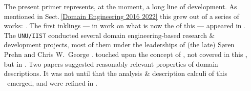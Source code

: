 
\begynd
\pind The present primer represents, at the moment, a long line of development.
\pind As mentioned in Sect.\,\vref{Domain Engineering 2016 2022} this grew out of a series of works:
\cite{TheSEBook3,Kiev:2010ptI,Kiev:2010ptII,BjornerFAoC2015MDAAD,BjornerTOSEM2018,BjornerMonograph2020}. 
\begynd
\pind The first inklings --- in  work on 
\pind what is now the  of this \primer --- \nyl appeared in
      \cite[1995-1996]{UNUIIST:37,UNUIIST:46,db:UNUIIST:48,UNUIIST:58,UNUIIST:59}. 
\pind The  \texttt{UNU/IIST} \ysfchg{ } conducted several domain engineering-based
      research \& development projects, most of them under the
      leaderships of (the late) S{\o}ren Prehn and Chris W.\ George
      \cite{DBLP:conf/ac/George07x}. 
\pind \cite[2008]{dines:facs:2008} touched upon the concept of 
      , not covered in this \primer, but in
      \cite[2021]{BjornerMonograph2020}. 
\pind Two papers \cite[2010]{Kiev:2010ptI,Kiev:2010ptII} suggested
      reasonably relevant properties of domain descriptions.
\pind It was not until \cite[2017]{BjornerFAoC2015MDAAD} that the analysis
      \& description calculi of this \primer\ emerged, and were
      refined in \cite[2019]{BjornerTOSEM2018}. 
\afslut

